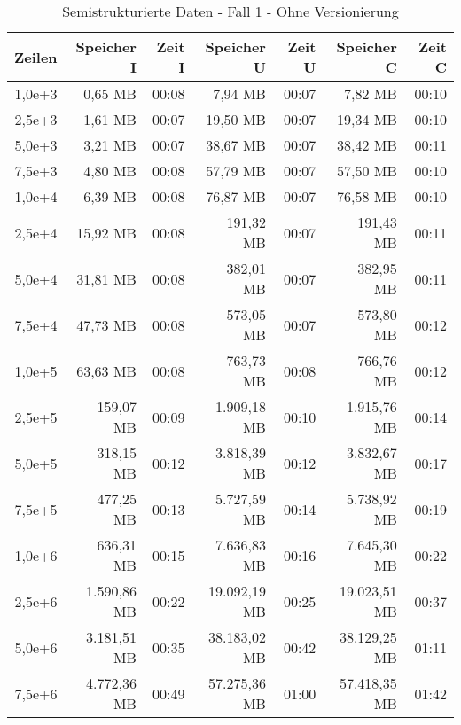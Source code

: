 \begin{table}
    \centering
    \begin{tabular}{|r|r|r|r|r|r|r|}
        \hline
        \textbf{Zeilen} & \textbf{Speicher I} & \textbf{Zeit I} & \textbf{Speicher U} & \textbf{Zeit U} & \textbf{Speicher C} & \textbf{Zeit C} \\ \hline
        1,0e+3 & 0,65 MB       & 00:08 & 7,94 MB       & 00:07 & 7,82 MB       & 00:10 \\ \hline
        2,5e+3 & 1,61 MB       & 00:07 & 19,50 MB      & 00:07 & 19,34 MB      & 00:10 \\ \hline
        5,0e+3 & 3,21 MB       & 00:07 & 38,67 MB      & 00:07 & 38,42 MB      & 00:11 \\ \hline
        7,5e+3 & 4,80 MB       & 00:08 & 57,79 MB      & 00:07 & 57,50 MB      & 00:10 \\ \hline
        1,0e+4 & 6,39 MB       & 00:08 & 76,87 MB      & 00:07 & 76,58 MB      & 00:10 \\ \hline
        2,5e+4 & 15,92 MB      & 00:08 & 191,32 MB     & 00:07 & 191,43 MB     & 00:11 \\ \hline
        5,0e+4 & 31,81 MB      & 00:08 & 382,01 MB     & 00:07 & 382,95 MB     & 00:11 \\ \hline
        7,5e+4 & 47,73 MB      & 00:08 & 573,05 MB     & 00:07 & 573,80 MB     & 00:12 \\ \hline
        1,0e+5 & 63,63 MB      & 00:08 & 763,73 MB     & 00:08 & 766,76 MB     & 00:12 \\ \hline
        2,5e+5 & 159,07 MB     & 00:09 & 1.909,18 MB   & 00:10 & 1.915,76 MB   & 00:14 \\ \hline
        5,0e+5 & 318,15 MB     & 00:12 & 3.818,39 MB   & 00:12 & 3.832,67 MB   & 00:17 \\ \hline
        7,5e+5 & 477,25 MB     & 00:13 & 5.727,59 MB   & 00:14 & 5.738,92 MB   & 00:19 \\ \hline
        1,0e+6 & 636,31 MB     & 00:15 & 7.636,83 MB   & 00:16 & 7.645,30 MB   & 00:22 \\ \hline
        2,5e+6 & 1.590,86 MB   & 00:22 & 19.092,19 MB  & 00:25 & 19.023,51 MB  & 00:37 \\ \hline
        5,0e+6 & 3.181,51 MB   & 00:35 & 38.183,02 MB  & 00:42 & 38.129,25 MB  & 01:11 \\ \hline
        7,5e+6 & 4.772,36 MB   & 00:49 & 57.275,36 MB  & 01:00 & 57.418,35 MB  & 01:42 \\ \hline
    \end{tabular}
    \caption{Semistrukturierte Daten - Fall 1 - Ohne Versionierung}
\end{table}

